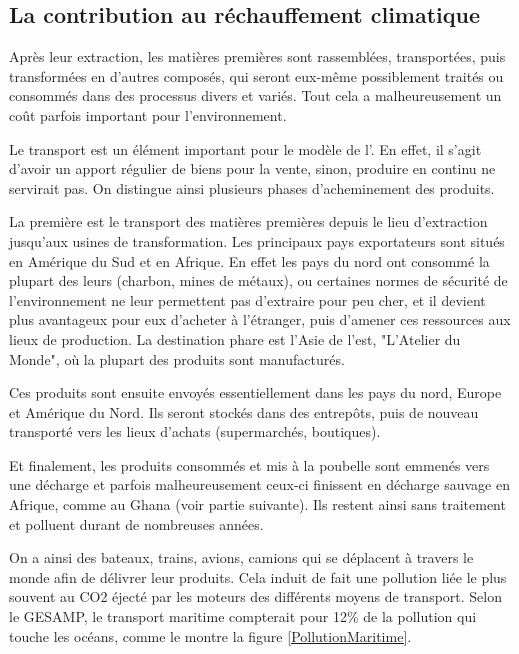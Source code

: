 \subsection{La contribution au réchauffement climatique}


Après leur extraction, les matières premières sont rassemblées, transportées, puis transformées en d'autres composés, qui seront eux-même possiblement traités ou consommés dans des processus divers et variés. Tout cela a malheureusement un coût parfois important pour l'environnement.

\medbreak Le transport est un élément important pour le modèle de l'\op. En effet, il s'agit d'avoir un apport régulier de biens pour la vente, sinon, produire en continu ne servirait pas. On distingue ainsi plusieurs phases d'acheminement des produits.

La première est le transport des matières premières depuis le lieu d'extraction jusqu'aux usines de transformation. Les principaux pays exportateurs sont situés en Amérique du Sud et en Afrique. En effet les pays du nord ont consommé la plupart des leurs (charbon, mines de métaux), ou certaines normes de sécurité de l'environnement ne leur permettent pas d'extraire pour peu cher, et il devient plus avantageux pour eux d'acheter à l'étranger, puis d'amener ces ressources aux lieux de production. La destination phare est l'Asie de l'est, "L'Atelier du Monde", où la plupart des produits sont manufacturés.

Ces produits sont ensuite envoyés essentiellement dans les pays du nord, Europe et Amérique du Nord. Ils seront stockés dans des entrepôts, puis de nouveau transporté vers les lieux d'achats (supermarchés, boutiques). 

Et finalement, les produits consommés et mis à la poubelle sont emmenés vers une décharge et parfois malheureusement ceux-ci finissent en décharge sauvage en Afrique, comme au Ghana (voir partie suivante). Ils restent ainsi sans traitement et polluent durant de nombreuses années.

On a ainsi des bateaux, trains, avions, camions qui se déplacent à travers le monde afin de délivrer leur produits. Cela induit de fait une pollution liée le plus souvent au CO2 éjecté par les moteurs des différents moyens de transport. Selon le GESAMP, le transport maritime compterait pour 12\% de la pollution qui touche les océans, comme le montre la figure \ref{PollutionMaritime}.

